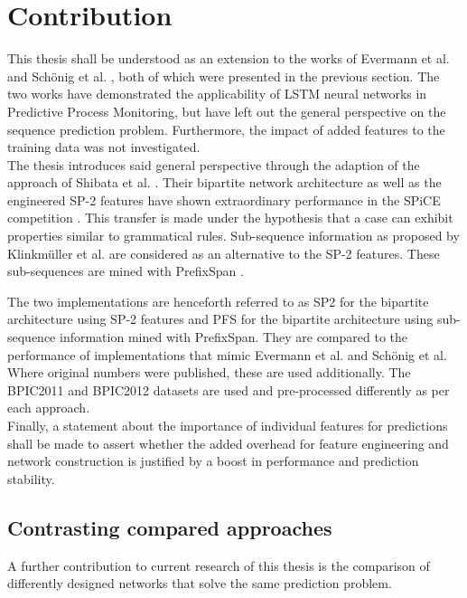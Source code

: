 \chapter{Contribution}\label{sec:contribution}

This thesis shall be understood as an extension to the works of Evermann et al. \cite{evermann2016} and Schönig et al. \cite{schoenig2018}, both of which were presented in the previous section. The two works have demonstrated the applicability of LSTM neural networks in Predictive Process Monitoring, but have left out the general perspective on the sequence prediction problem. Furthermore, the impact of added features to the training data was not investigated.\\

The thesis introduces said general perspective through the adaption of the approach of Shibata et al. \cite{shibata2016bipartite}. Their bipartite network architecture as well as the engineered SP-2 features have shown extraordinary performance in the SPiCE competition \cite{web:spice}. This transfer is made under the hypothesis that a case can exhibit properties similar to grammatical rules. Sub-sequence information as proposed by Klinkmüller et al. \cite{klinkmuller2018reliablemonitoring} are considered as an alternative to the SP-2 features. These sub-sequences are mined with PrefixSpan \cite{pei2001prefixspan}.

The two implementations are henceforth referred to as SP2 for the bipartite architecture using SP-2 features and PFS for the bipartite architecture using sub-sequence information mined with PrefixSpan. They are compared to the performance of implementations that mimic Evermann et al. and Schönig et al. Where original numbers were published, these are used additionally. The BPIC2011 \cite{BPIC2011} and BPIC2012 \cite{BPIC2012} datasets are used and pre-processed differently as per each approach.\\

Finally, a statement about the importance of individual features for predictions shall be made to assert whether the added overhead for feature engineering and network construction is justified by a boost in performance and prediction stability.

\section{Contrasting compared approaches}
A further contribution to current research of this thesis is the comparison of differently designed networks that solve the same prediction problem.

